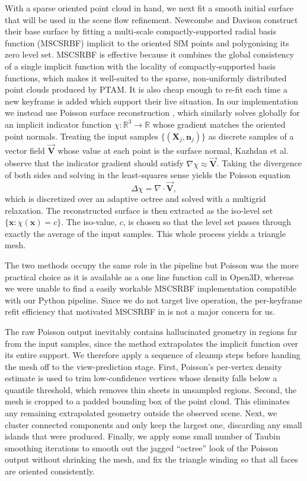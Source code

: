 \documentclass[10pt,twocolumn]{article}
\begin{document}
With a sparse oriented point cloud in hand, we next fit a smooth initial surface that will be used in the scene flow refinement.
Newcombe and Davison \cite{newcombe2010} construct their base surface by fitting a multi-scale compactly-supported radial basis function (MSCSRBF) implicit \cite{Ohtake03b} to the oriented SfM points and polygonising its zero level set. MSCSRBF is effective because it combines the global consistency of a single implicit function with the locality of compactly-supported basis functions, which makes it well-suited to the sparse, non-uniformly distributed point clouds produced by PTAM.
It is also cheap enough to re-fit each time a new keyframe is added which support their live situation.
In our implementation we instead use Poisson surface reconstruction \cite{Poisson}, which similarly solves globally for an implicit indicator function $\chi : \mathbb{R}^3 \to \mathbb{R}$ whose gradient matches the oriented point normals.
Treating the input samples $\{(\mathbf{X}_j, \mathbf{n}_j)\}$ as discrete samples of a vector field $\vec{\mathbf{V}}$ whose value at each point is the surface normal, Kazhdan et al. observe that the indicator gradient should satisfy $\nabla\chi \approx \vec{\mathbf{V}}$. Taking the divergence of both sides and solving in the least-squares sense yields the Poisson equation
\begin{equation}
    \Delta\chi = \nabla\cdot\vec{\mathbf{V}},
\end{equation}
which is discretized over an adaptive octree and solved with a multigrid relaxation. The reconstructed surface is then extracted as the iso-level set $\{\mathbf{x} : \chi(\mathbf{x}) = c\}$. The iso-value, $c$, is chosen so that the level set passes through exactly the average of the input samples. This whole process yields a triangle mesh.

The two methods occupy the same role in the pipeline but Poisson was the more practical choice as it is available as a one line function call in Open3D, whereas we were unable to find a easily workable MSCSRBF implementation compatible with our Python pipeline. Since we do not target live operation, the per-keyframe refit efficiency that motivated MSCSRBF in \cite{newcombe2010} is not a major concern for us.

The raw Poisson output inevitably contains hallucinated geometry in regions far from the input samples, since the method extrapolates the implicit function over its entire support. We therefore apply a sequence of cleanup steps before handing the mesh off to the view-prediction stage.
First, Poisson's per-vertex density estimate is used to trim low-confidence vertices whose density falls below a quantile threshold, which removes thin sheets in unsampled regions.
Second, the mesh is cropped to a padded bounding box of the point cloud. This eliminates any remaining extrapolated geometry outside the observed scene.
Next, we cluster connected components and only keep the largest one, discarding any small islands that were produced.
Finally, we apply some small number of Taubin smoothing iterations to smooth out the jagged ``octree'' look of the Poisson output without shrinking the mesh, and fix the triangle winding so that all faces are oriented consistently.
\end{document}

